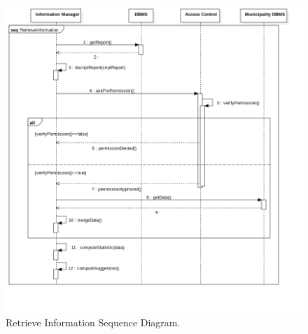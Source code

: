 \documentclass{report}
\begin{document}
\newpage
\begin{figure}[ht!]
\begin{center}
\includegraphics[width=\textwidth]{./img/RetrieveInformationSD.png}
\end{center}
\caption{Retrieve Information Sequence Diagram.}
\label{fig:SequenceDiagram4}
\end{figure}

\newpage 
\end{document}
